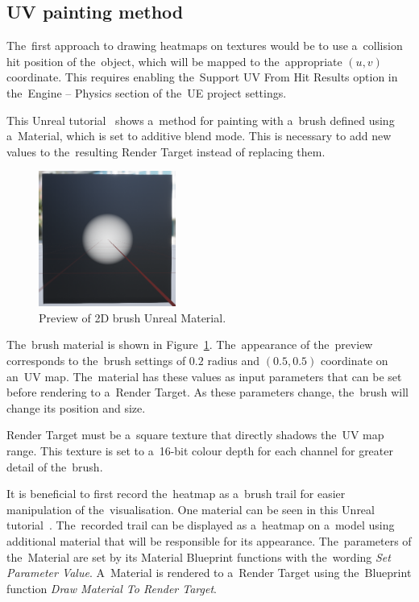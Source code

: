 \subsection{UV painting method}

The~first approach to drawing heatmaps on textures would be to use a~collision hit position of the~object, which will be mapped to the~appropriate $(u, v)$ coordinate. This requires enabling the~Support UV From Hit Results option in the~Engine -- Physics section of the~UE project settings. 

This Unreal tutorial~\cite{texture-painting-tutorial} shows a~method for painting with a~brush defined using a~Material, which is set to additive blend mode. This is necessary to add new values to the~resulting Render Target instead of replacing them. 

\begin{figure}[!ht]\centering
    \includegraphics[width=0.4\textwidth]{img/Brush-material.png}
    \caption[Preview of 2D brush Unreal Material.]{Preview of 2D brush Unreal Material.~\cite{basic-heatmap-tutorial}}
    \label{fig:brush-material}
\end{figure}

The~brush material is shown in Figure~\ref{fig:brush-material}. The~appearance of the~preview corresponds to the~brush settings of $0.2$ radius and $(0.5, 0.5)$ coordinate on an~UV map. The~material has these values as input parameters that can be set before rendering to a~Render Target. As these parameters change, the~brush will change its position and size.

Render Target must be a~square texture that directly shadows the~UV map range. This texture is set to a~16-bit colour depth for each channel for greater detail of the~brush.

It is beneficial to first record the~heatmap as a~brush trail for easier manipulation of the~visualisation. One material can be seen in this Unreal tutorial~\cite{basic-heatmap-tutorial}. The~recorded trail can be displayed as a~heatmap on a~model using additional material that will be responsible for its appearance. The~parameters of the~Material are set by its Material Blueprint functions with the~wording \emph{Set Parameter Value}. A~Material is rendered to a~Render Target using the~Blueprint function \emph{Draw Material To Render Target}.


